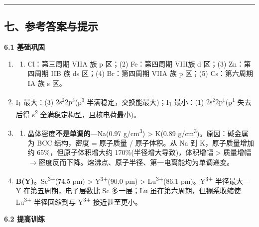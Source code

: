 \documentclass[a4paper,11pt]{ctexart}
\providecommand{\tightlist}{\setlength{\itemsep}{0pt}\setlength{\parskip}{0pt}}
\newcommand{\箭}{\ensuremath{\rightarrow}}
\newcommand{\左箭}{\ensuremath{\leftarrow}}
\newcommand{\上箭}{\ensuremath{\uparrow}}
\newcommand{\下箭}{\ensuremath{\downarrow}}
\newcommand{\衡}{\ensuremath{\rightleftharpoons}}
\newcommand{\双箭}{\ensuremath{\leftrightarrow}}
\newcommand{\约等于}{\ensuremath{\approx}}
\newcommand{\小于等于}{\ensuremath{\leq}}
\newcommand{\大于等于}{\ensuremath{\geq}}
\newcommand{\不等于}{\ensuremath{\neq}}
\newcommand{\西格马}{\ensuremath{\sigma}}
\newcommand{\派}{\ensuremath{\pi}}
\begin{document}
\begin{center}\rule{0.5\linewidth}{0.5pt}\end{center}

\subsection{七、参考答案与提示}\label{ux4e03ux53c2ux8003ux7b54ux6848ux4e0eux63d0ux793a}

\textbf{6.1 基础巩固}

\begin{enumerate}
\def\labelenumi{\arabic{enumi}.}
\item
  \begin{enumerate}
  \def\labelenumii{(\arabic{enumii})}
  \tightlist
  \item
    Cl：第三周期 VIIA 族 p 区；(2) Fe：第四周期 VIII族 d 区；(3) Zn：第四周期 IIB 族 ds 区；(4) Br：第四周期 VIIA 族 p 区；(5) Cs：第六周期 IA 族 s 区。
  \end{enumerate}
\item
  I\textsubscript{1} 最大：(3) \(2\mathrm{s}^2 2\mathrm{p}^3\)(p\textsuperscript{3} 半满稳定，交换能最大)；I\textsubscript{1} 最小：(1) \(2\mathrm{s}^2 2\mathrm{p}^1\)(p\textsuperscript{1} 失去后得 s\textsuperscript{2} 全满稳定构型，且核电荷最小)。
\item
  \begin{enumerate}
  \def\labelenumii{(\alph{enumii})}
  \setcounter{enumii}{2}
  \tightlist
  \item
    晶体密度\textbf{不是单调的}---Na(0.97 g/cm\textsuperscript{3}) \textgreater{} K(0.89 g/cm\textsuperscript{3})。原因：碱金属为 BCC 结构，密度 = 原子质量 / 原子体积。从 Na 到 K，原子质量增加约 65\%，但原子体积增大约 170\%(半径增大导致)，体积增幅 \textgreater{} 质量增幅 \箭 密度反而下降。熔沸点、原子半径、第一电离能均为单调递变。
  \end{enumerate}
\item
  \textbf{B(Y)}。Sc\textsuperscript{3+}(74.5 pm) \textgreater{} Y\textsuperscript{3+}(90.0 pm) \textgreater{} Lu\textsuperscript{3+}(86.1 pm)。Y\textsuperscript{3+} 半径最大---Y 在第五周期，电子层数比 Sc 多一层；Lu 虽在第六周期，但镧系收缩使 Lu\textsuperscript{3+} 半径回缩到与 Y\textsuperscript{3+} 接近甚至更小。
\end{enumerate}

\textbf{6.2 提高训练}
\end{document}
